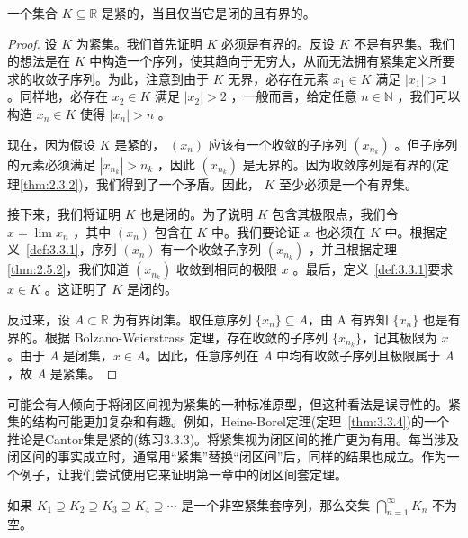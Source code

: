 \begin{Thm}
  \label{thm:3.3.4}
  一个集合 \(K \subseteq  \mathbb{R}\) 是紧的，当且仅当它是闭的且有界的。
\end{Thm}

\begin{proof}
设 \(K\) 为紧集。我们首先证明 \(K\) 必须是有界的。反设 \(K\) 不是有界集。我们的想法是在 \(K\) 中构造一个序列，使其趋向于无穷大，从而无法拥有紧集定义所要求的收敛子序列。为此，注意到由于 \(K\) 无界，必存在元素 \({x}_{1} \in  K\) 满足 \(\left| {x}_{1}\right|  > 1\) 。同样地，必存在 \({x}_{2} \in  K\) 满足 \(\left| {x}_{2}\right|  > 2\) ，一般而言，给定任意 \(n \in  \mathbb{N}\) ，我们可以构造 \({x}_{n} \in  K\) 使得 \(\left| {x}_{n}\right|  > n\) 。

现在，因为假设 \(K\) 是紧的， \(\left( {x}_{n}\right)\) 应该有一个收敛的子序列 \(\left( {x}_{{n}_{k}}\right)\) 。但子序列的元素必须满足 \(\left| {x}_{{n}_{k}}\right|  > {n}_{k}\) ，因此 \(\left( {x}_{{n}_{k}}\right)\) 是无界的。因为收敛序列是有界的(定理\ref{thm:2.3.2})，我们得到了一个矛盾。因此， \(K\) 至少必须是一个有界集。

接下来，我们将证明 \(K\) 也是闭的。为了说明 \(K\) 包含其极限点，我们令 \(x = \lim {x}_{n}\) ，其中 \(\left( {x}_{n}\right)\) 包含在 \(K\) 中。我们要论证 \(x\) 也必须在 \(K\) 中。根据定义~\ref{def:3.3.1}，序列 \(\left( {x}_{n}\right)\) 有一个收敛子序列 \(\left( {x}_{{n}_{k}}\right)\) ，并且根据定理\ref{thm:2.5.2}，我们知道 \(\left( {x}_{{n}_{k}}\right)\) 收敛到相同的极限 \(x\) 。最后，定义~\ref{def:3.3.1}要求 \(x \in  K\) 。这证明了 \(K\) 是闭的。


反过来，设 \( A \subset \mathbb{R} \) 为有界闭集。取任意序列 \(\{x_n\} \subseteq A\)，由 A 有界知 \(\{x_n\}\) 也是有界的。根据 Bolzano-Weierstrass 定理，存在收敛的子序列 \(\{x_{n_k}\}\)，记其极限为 \( x \)。由于 \( A \) 是闭集，\( x \in A \)。因此，任意序列在 \( A \) 中均有收敛子序列且极限属于 \( A \)，故 \( A \) 是紧集。
\end{proof}

可能会有人倾向于将闭区间视为紧集的一种标准原型，但这种看法是误导性的。紧集的结构可能更加复杂和有趣。例如，Heine-Borel定理(定理~\ref{thm:3.3.4})的一个推论是Cantor集是紧的(练习3.3.3)。将紧集视为闭区间的推广更为有用。每当涉及闭区间的事实成立时，通常用“紧集”替换“闭区间”后，同样的结果也成立。作为一个例子，让我们尝试使用它来证明第一章中的闭区间套定理。

\begin{Thm}
  \label{thm:3.3.5}
  如果 \({K}_{1} \supseteq  {K}_{2} \supseteq  {K}_{3} \supseteq  {K}_{4} \supseteq  \cdots\) 是一个非空紧集套序列，那么交集 \(\mathop{\bigcap }\limits_{{n = 1}}^{\infty }{K}_{n}\) 不为空。
\end{Thm}

